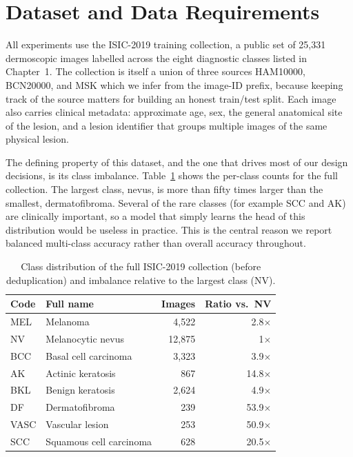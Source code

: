 \section{Dataset and Data Requirements}

All experiments use the ISIC-2019 training collection, a public set of 25{,}331
dermoscopic images labelled across the eight diagnostic classes listed in
Chapter~1. The collection is itself a union of three sources HAM10000,
BCN20000, and MSK which we infer from the image-ID prefix, because keeping
track of the source matters for building an honest train/test split. Each image
also carries clinical metadata: approximate age, sex, the general anatomical
site of the lesion, and a lesion identifier that groups multiple images of the
same physical lesion.

The defining property of this dataset, and the one that drives most of our
design decisions, is its class imbalance. Table~\ref{tab:classdist} shows the
per-class counts for the full collection. The largest class, nevus, is more than
fifty times larger than the smallest, dermatofibroma. Several of the rare
classes (for example SCC and AK) are clinically important, so a model that
simply learns the head of this distribution would be useless in practice. This
is the central reason we report balanced multi-class accuracy rather than overall
accuracy throughout.

\begin{table}[H]
\centering
\caption{Class distribution of the full ISIC-2019 collection (before
deduplication) and imbalance relative to the largest class (NV).}
\label{tab:classdist}
\begin{tabular}{llrr}
\toprule
Code & Full name & Images & Ratio vs.\ NV \\
\midrule
MEL  & Melanoma                  & 4{,}522  & 2.8$\times$  \\
NV   & Melanocytic nevus         & 12{,}875 & 1$\times$    \\
BCC  & Basal cell carcinoma      & 3{,}323  & 3.9$\times$  \\
AK   & Actinic keratosis         & 867      & 14.8$\times$ \\
BKL  & Benign keratosis          & 2{,}624  & 4.9$\times$  \\
DF   & Dermatofibroma            & 239      & 53.9$\times$ \\
VASC & Vascular lesion           & 253      & 50.9$\times$ \\
SCC  & Squamous cell carcinoma   & 628      & 20.5$\times$ \\
\bottomrule
\end{tabular}
\end{table}

